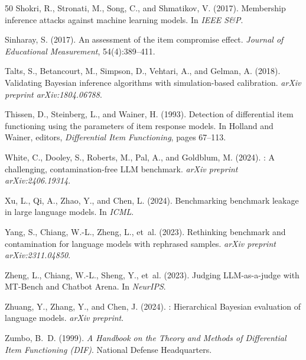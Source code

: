 \documentclass[11pt,a4paper]{article}
\begin{document}
\begin{thebibliography}{50}
Shokri, R., Stronati, M., Song, C., and Shmatikov, V. (2017).
\newblock Membership inference attacks against machine learning models.
\newblock In \emph{IEEE S\&P}.

Sinharay, S. (2017).
\newblock An assessment of the item compromise effect.
\newblock \emph{Journal of Educational Measurement}, 54(4):389--411.

Talts, S., Betancourt, M., Simpson, D., Vehtari, A., and Gelman, A. (2018).
\newblock Validating {B}ayesian inference algorithms with simulation-based calibration.
\newblock \emph{arXiv preprint arXiv:1804.06788}.

Thissen, D., Steinberg, L., and Wainer, H. (1993).
\newblock Detection of differential item functioning using the parameters of item response models.
\newblock In Holland and Wainer, editors, \emph{Differential Item Functioning}, pages 67--113.

White, C., Dooley, S., Roberts, M., Pal, A., and Goldblum, M. (2024).
: A challenging, contamination-free {LLM} benchmark.
\newblock \emph{arXiv preprint arXiv:2406.19314}.

Xu, L., Qi, A., Zhao, Y., and Chen, L. (2024).
\newblock Benchmarking benchmark leakage in large language models.
\newblock In \emph{ICML}.

Yang, S., Chiang, W.-L., Zheng, L., et~al. (2023).
\newblock Rethinking benchmark and contamination for language models with rephrased samples.
\newblock \emph{arXiv preprint arXiv:2311.04850}.

Zheng, L., Chiang, W.-L., Sheng, Y., et~al. (2023).
\newblock Judging {LLM}-as-a-judge with {MT-Bench} and {Chatbot Arena}.
\newblock In \emph{NeurIPS}.

Zhuang, Y., Zhang, Y., and Chen, J. (2024).
: Hierarchical {B}ayesian evaluation of language models.
\newblock \emph{arXiv preprint}.

Zumbo, B.~D. (1999).
\newblock \emph{A Handbook on the Theory and Methods of Differential Item Functioning ({DIF})}.
\newblock National Defense Headquarters.

\end{thebibliography}
\end{document}
